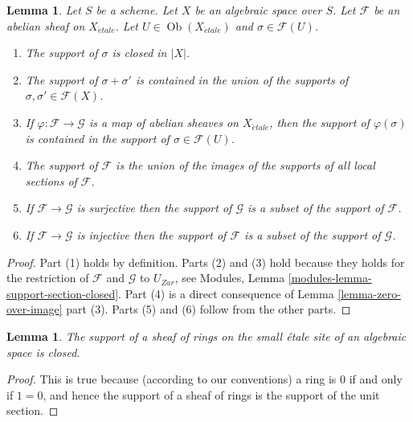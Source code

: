 \documentclass{stacks-project}
\theoremstyle{plain}
\newtheorem{lemma}[subsection]{Lemma}
\theoremstyle{definition}
\theoremstyle{remark}
\numberwithin{equation}{subsection}
\def\Ob{\mathop{\mathrm{Ob}}\nolimits}
\def\etale{{\acute{e}tale}}
\begin{document}
\begin{lemma}
\label{lemma-support-section-closed}
Let $S$ be a scheme.
Let $X$ be an algebraic space over $S$.
Let $\mathcal{F}$ be an abelian sheaf on $X_\etale$.
Let $U \in \Ob(X_\etale)$ and $\sigma \in \mathcal{F}(U)$.
\begin{enumerate}
\item The support of $\sigma$ is closed in $|X|$.
\item The support of $\sigma + \sigma'$ is contained in the union of
the supports of $\sigma, \sigma' \in \mathcal{F}(X)$.
\item If $\varphi : \mathcal{F} \to \mathcal{G}$ is a map of
abelian sheaves on $X_\etale$, then the support of $\varphi(\sigma)$ is
contained in the support of $\sigma \in \mathcal{F}(U)$.
\item The support of $\mathcal{F}$ is the union of the images of the
supports of all local sections of $\mathcal{F}$.
\item If $\mathcal{F} \to \mathcal{G}$ is surjective then the support
of $\mathcal{G}$ is a subset of the support of $\mathcal{F}$.
\item If $\mathcal{F} \to \mathcal{G}$ is injective then the support
of $\mathcal{F}$ is a subset of the support of $\mathcal{G}$.
\end{enumerate}
\end{lemma}

\begin{proof}
Part (1) holds by definition.
Parts (2) and (3) hold because they holds for the restriction of
$\mathcal{F}$ and $\mathcal{G}$ to $U_{Zar}$, see
Modules, Lemma \ref{modules-lemma-support-section-closed}.
Part (4) is a direct consequence of
Lemma \ref{lemma-zero-over-image} part (3).
Parts (5) and (6) follow from the other parts.
\end{proof}

\begin{lemma}
\label{lemma-support-sheaf-rings-closed}
The support of a sheaf of rings on the small \'etale site of an
algebraic space is closed.
\end{lemma}

\begin{proof}
This is true because (according to our conventions)
a ring is $0$ if and only if
$1 = 0$, and hence the support of a sheaf of rings
is the support of the unit section.
\end{proof}
\end{document}
